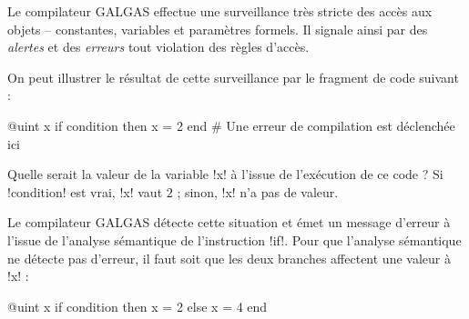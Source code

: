 \newcommand\BoucleRouge[3]{
  \path (#1) edge [loop #2, -stealth, thick, \RougeAutomate] node[draw=\RougeAutomate, rounded corners, fill=\FondAutomate] {\it#3} (#1) ;
}


Le compilateur GALGAS effectue une surveillance très stricte des accès aux objets -- constantes, variables et paramètres formels. Il signale ainsi par des \emph{alertes} et des \emph{erreurs} tout violation des règles d'accès.

On peut illustrer le résultat de cette surveillance par le fragment de code suivant :
\begin{galgas}
@uint x
if condition then
  x = 2
end # Une erreur de compilation est déclenchée ici
\end{galgas}

Quelle serait la valeur de la variable \ggs!x! à l'issue de l'exécution de ce code ? Si \ggs!condition! est vrai, \ggs!x! vaut $2$ ; sinon, \ggs!x! n'a pas de valeur.

Le compilateur GALGAS détecte cette situation et émet un message d'erreur à l'issue de l'analyse sémantique de l'instruction \ggs!if!. Pour que l'analyse sémantique ne détecte pas d'erreur, il faut soit que les deux branches affectent une valeur à \ggs!x! :

\begin{galgas}
@uint x
if condition then
  x = 2
else
  x = 4
end
\end{galgas}












